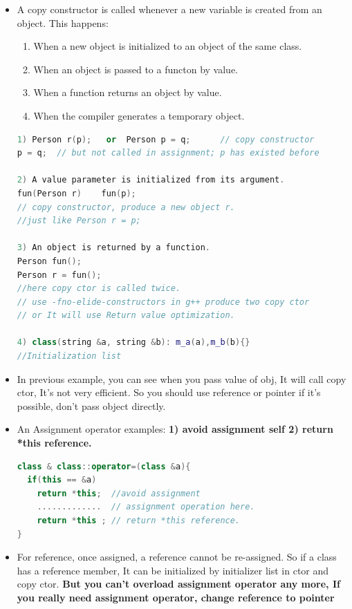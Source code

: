 \documentclass[a4paper,12pt,twoside]{book}
\begin{document}
\begin{itemize}
\item A copy constructor is called whenever a new variable is created from an object. This happens:

\begin{enumerate}
\item When a new object is initialized to an object of the same class.
\item When an object is passed to a functon by value.
\item When a function returns an object by value.
\item When the compiler generates a temporary object.
\end{enumerate}

\begin{lstlisting}[frame=single, language=c++]
1) Person r(p);   or  Person p = q;      // copy constructor
p = q;  // but not called in assignment; p has existed before

2) A value parameter is initialized from its argument.
fun(Person r)    fun(p);
// copy constructor, produce a new object r.
//just like Person r = p;

3) An object is returned by a function.
Person fun();
Person r = fun();
//here copy ctor is called twice.
// use -fno-elide-constructors in g++ produce two copy ctor
// or It will use Return value optimization.

4) class(string &a, string &b): m_a(a),m_b(b){}
//Initialization list
\end{lstlisting}

\item In previous example, you can see when you pass  value of obj, It will call copy ctor, It's not very efficient. So you should use reference or pointer if it's possible, don't pass object directly.


\item An Assignment operator examples: \textbf{1) avoid assignment self 2) return *this reference. }
\begin{lstlisting}[frame=single, language=c++]
class & class::operator=(class &a){
  if(this == &a)
    return *this;  //avoid assignment
    .............  // assignment operation here.
    return *this ; // return *this reference.
}
\end{lstlisting}

\item For reference, once assigned, a reference cannot be re-assigned. So if a class has a reference member, It can be initialized by initializer list in ctor and copy ctor. \textbf{But you can't overload assignment operator any more, If you really need assignment operator, change reference to pointer}

\end{itemize}
\end{document}
